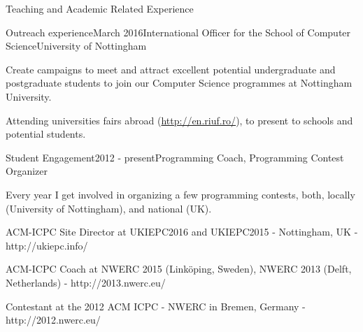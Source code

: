 \documentclass{resume} %
\begin{document}
\begin{rSection}{Teaching and Academic Related Experience}
\begin{rSubsection}{Outreach experience}{March 2016}{International Officer for the School of Computer Science}{University of Nottingham}
        \item Create campaigns to meet and attract excellent potential undergraduate and postgraduate students to join our Computer Science programmes at Nottingham University.
        \item Attending universities fairs abroad (\url{http://en.riuf.ro/}), to present to schools and potential students.
    \end{rSubsection}
\vspace{-1mm}
    \begin{rSubsection}{Student Engagement}{2012 - present}{Programming Coach, Programming Contest Organizer}{}
    	\item Every year I get involved in organizing a few programming contests, both, locally (University of Nottingham), and national (UK).
    	\item  ACM-ICPC Site Director at UKIEPC2016 and UKIEPC2015 - Nottingham, UK - {http://ukiepc.info/}
    	\item  ACM-ICPC Coach at NWERC 2015 (Linköping, Sweden), NWERC 2013 (Delft, Netherlands) - {http://2013.nwerc.eu/} 
    	\item Contestant at the 2012 ACM ICPC - NWERC in Bremen, Germany - {http://2012.nwerc.eu/}
    \end{rSubsection}
\end{rSection}
\vspace{-2 mm}
\end{document}
